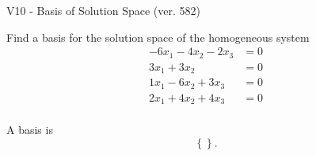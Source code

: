 \begin{exercise}
  \begin{exerciseTitle}V10 - Basis of Solution Space (ver. 582)\end{exerciseTitle}
  \begin{exerciseStatement}
    Find a basis for the solution space of the homogeneous system 
\begin{align*}
 -6 x_ 1 -4 x_ 2 -2 x_ 3 &= 0  \\ 
  3 x_ 1 + 3 x_ 2 &= 0  \\ 
  1 x_ 1 -6 x_ 2 + 3 x_ 3 &= 0  \\ 
  2 x_ 1 + 4 x_ 2 + 4 x_ 3 &= 0  \\ 
 \end{align*}


 
  \end{exerciseStatement}

  \begin{exerciseAnswer}
   A basis is   
\[\left\{\right\}.\]

  


  \end{exerciseAnswer}
\end{exercise}